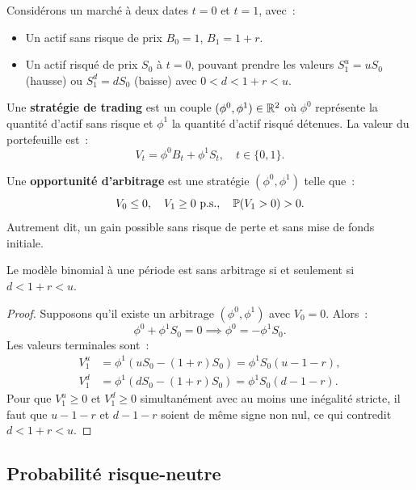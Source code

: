 Consid\'erons un march\'e \`a deux dates $t=0$ et $t=1$, avec~:
\begin{itemize}
    \item Un actif sans risque de prix $B_0 = 1$, $B_1 = 1+r$.
    \item Un actif risqu\'e de prix $S_0$ \`a $t=0$, pouvant prendre les
          valeurs $S_1^u = uS_0$ (hausse) ou $S_1^d = dS_0$ (baisse)
          avec $0 < d < 1+r < u$.
\end{itemize}

\begin{definition}
Une \textbf{strat\'egie de trading} est un couple $(\phi^0, \phi^1) \in \mathbb{R}^2$
o\`u $\phi^0$ repr\'esente la quantit\'e d'actif sans risque et $\phi^1$
la quantit\'e d'actif risqu\'e d\'etenues. La valeur du portefeuille est~:
\[
    V_t = \phi^0 B_t + \phi^1 S_t, \quad t \in \{0,1\}.
\]
\end{definition}

\begin{definition}
Une \textbf{opportunit\'e d'arbitrage} est une strat\'egie $(\phi^0, \phi^1)$
telle que~:
\[
    V_0 \leq 0, \quad V_1 \geq 0 \text{ p.s.}, \quad \mathbb{P}(V_1 > 0) > 0.
\]
Autrement dit, un gain possible sans risque de perte et sans mise de fonds
initiale.
\end{definition}

\begin{theoreme}
Le mod\`ele binomial \`a une p\'eriode est sans arbitrage si et seulement si
$d < 1+r < u$.
\end{theoreme}

\begin{proof}
Supposons qu'il existe un arbitrage $(\phi^0, \phi^1)$ avec $V_0 = 0$. Alors~:
\[
    \phi^0 + \phi^1 S_0 = 0 \implies \phi^0 = -\phi^1 S_0.
\]
Les valeurs terminales sont~:
\begin{align*}
    V_1^u &= \phi^1(uS_0 - (1+r)S_0) = \phi^1 S_0(u - 1 - r), \\
    V_1^d &= \phi^1(dS_0 - (1+r)S_0) = \phi^1 S_0(d - 1 - r).
\end{align*}
Pour que $V_1^u \geq 0$ et $V_1^d \geq 0$ simultan\'ement avec au moins
une in\'egalit\'e stricte, il faut que $u - 1 - r$ et $d - 1 - r$ soient
de m\^eme signe non nul, ce qui contredit $d < 1+r < u$.
\end{proof}

\subsection{Probabilit\'e risque-neutre}

